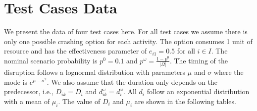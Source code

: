 \documentclass[11pt]{article}
\begin{document}
\section{Test Cases Data} \label{appen:data}
    We present the data of four test cases here. For all test cases we assume there is only one possible crashing option for each activity. The option consumes 1 unit of resource and has the effectiveness parameter of \(e_{i1} = 0.5\) for all \(i \in I\). The nominal scenario probability is \(p^0 = 0.1\) and \(p^\omega = \frac{1 - p^0}{|\Omega|}\). The timing of the disruption follows a lognormal distribution with parameters \(\mu\) and \(\sigma\) where the mode is \(e^{\mu - \sigma^2}\). We also assume that the duration only depends on the predecessor, i.e., \(D_{ik} = D_i\) and \(d_{ik}^\omega = d_i^\omega\). All \(d_i\) follow an exponential distribution with a mean of \(\mu_i\). The value of \(D_i\) and \(\mu_i\) are shown in the following tables.
    \pagebreak
\end{document}
